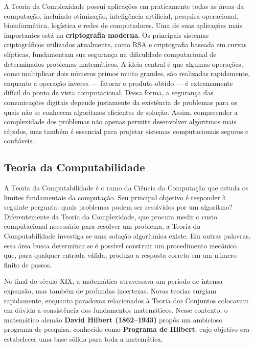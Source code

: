 \documentclass[
  brazilian,
  letterpaper,
]{book}
\theoremstyle{plain}
\theoremstyle{definition}
\theoremstyle{remark}
\begin{document}
A Teoria da Complexidade possui aplicações em praticamente todas as
áreas da computação, incluindo otimização, inteligência artificial,
pesquisa operacional, bioinformática, logística e redes de computadores.
Uma de suas aplicações mais importantes está na \textbf{criptografia
moderna}. Os principais sistemas criptográficos utilizados atualmente,
como RSA e criptografia baseada em curvas elípticas, fundamentam sua
segurança na dificuldade computacional de determinados problemas
matemáticos. A ideia central é que algumas operações, como multiplicar
dois números primos muito grandes, são realizadas rapidamente, enquanto
a operação inversa --- fatorar o produto obtido --- é extremamente
difícil do ponto de vista computacional. Dessa forma, a segurança das
comunicações digitais depende justamente da existência de problemas para
os quais não se conhecem algoritmos eficientes de solução. Assim,
compreender a complexidade dos problemas não apenas permite desenvolver
algoritmos mais rápidos, mas também é essencial para projetar sistemas
computacionais seguros e confiáveis.

\subsection{Teoria da Computabilidade}\label{teoria-da-computabilidade}

A Teoria da Computabilidade é o ramo da Ciência da Computação que estuda
os limites fundamentais da computação. Seu principal objetivo é
responder à seguinte pergunta: quais problemas podem ser resolvidos por
um algoritmo? Diferentemente da Teoria da Complexidade, que procura
medir o custo computacional necessário para resolver um problema, a
Teoria da Computabilidade investiga se uma solução algorítmica existe.
Em outras palavras, essa área busca determinar se é possível construir
um procedimento mecânico que, para qualquer entrada válida, produza a
resposta correta em um número finito de passos.

No final do século XIX, a matemática atravessava um período de intensa
expansão, mas também de profundas incertezas. Novas teorias surgiam
rapidamente, enquanto paradoxos relacionados à Teoria dos Conjuntos
colocavam em dúvida a consistência dos fundamentos matemáticos. Nesse
contexto, o matemático alemão \textbf{David Hilbert (1862--1943)} propôs
um ambicioso programa de pesquisa, conhecido como \textbf{Programa de
Hilbert}, cujo objetivo era estabelecer uma base sólida para toda a
matemática.
\end{document}
